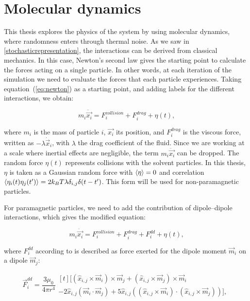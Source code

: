 \section{Molecular dynamics}



This thesis explores the physics of the system by using molecular dynamics, where randomness enters through thermal noise. As we saw in \ref{stochasticrepresentation}, the interactions can be derived from classical mechanics. In this case, Newton’s second law gives the starting point to calculate the forces acting on a single particle. In other words, at each iteration of the simulation we need to evaluate the forces that each particle experiences. Taking equation~(\ref{eq:newton}) as a starting point, and adding labels for the different interactions, we obtain:

\begin{equation}
  m_i\ddot{\vec{x_i}} = F^{collision}_i + F^{drag}_i + \eta(t)\text{,}
  \label{eq:langevinratchet}
\end{equation}

where $m_i$ is the mass of particle $i$, $\vec{x_i}$ its position, and $F^{drag}_i$ is the viscous force, written as $-\lambda \dot{\vec{x}}_i$, with $\lambda$ the drag coefficient of the fluid. Since we are working at a scale where inertial effects are negligible, the term $m_i\ddot{\vec{x_i}}$ can be dropped. The random force $\eta(t)$ represents collisions with the solvent particles. In this thesis, $\eta$ is taken as a Gaussian random force with $\expval{\eta} = 0$ and correlation $\expval{\eta_i(t)\eta_j(t')} = 2k_B T \lambda \delta_{i,j}\delta(t-t')$. This form will be used for non-paramagnetic particles.

For paramagnetic particles, we need to add the contribution of dipole–dipole interactions, which gives the modified equation:

\begin{equation}
  m_i\ddot{\vec{x_i}} = F^{collision}_i + F^{drag}_i + F^{dd}_i + \eta(t)\text{,}
  \label{eq:langevindipole}
\end{equation}

where $F^{dd}_i$ according to \cite{yung1998analytic} is described as force exerted for the dipole moment $\vec{m}_i$ on a dipole $\vec{m}_j$:

\begin{equation}
  \label{eq:dipoledipoleforce}
\vec{F}^{dd}_i = \frac{3\mu_0}{4\pi r^4}
\begin{multlined}[t]
\bigl[ (\hat{x}_{i,j} \times \vec{m}_i) \times \vec{m}_j
    + (\hat{x}_{i,j} \times \vec{m}_j) \times \vec{m}_i \\
    - 2\hat{x}_{i,j}(\vec{m}_i \cdot \vec{m}_j)
    + 5\hat{x}_{i,j}((\hat{x}_{i,j} \times \vec{m}_i) \cdot (\hat{x}_{i,j} \times \vec{m}_j)) \bigr],
\end{multlined}
\end{equation}

